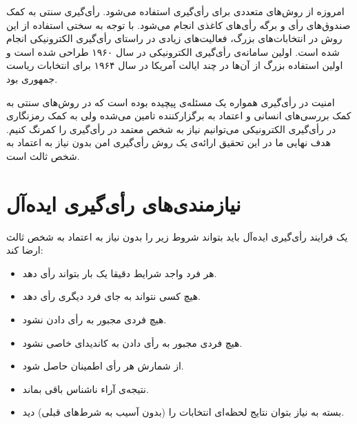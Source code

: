 \par
امروزه از روش‌های متعددی برای رأی‌گیری استفاده می‌شود. رأی‌گیری سنتی به کمک صندوق‌های رأی‌ و برگه‌ رأی‌های کاغذی انجام می‌شود. با توجه به سختی استفاده از این روش در انتخابات‌های بزرگ، فعالیت‌های زیادی در راستای رأی‌گیری الکترونیکی انجام شده است. اولین سامانه‌ی رأی‌گیری الکترونیکی در سال ۱۹۶۰ طراحی شده است و اولین استفاده‌ بزرگ از آن‌ها در چند ایالت آمریکا در سال ۱۹۶۴ برای انتخابات ریاست جمهوری بود. 

\par
امنیت در رأی‌گیری همواره یک مسئله‌ی پیچیده بوده است که در روش‌های سنتی به کمک بررسی‌های انسانی و اعتماد به برگزارکننده تامین می‌شده ولی به کمک رمزنگاری در رأی‌گیری الکترونیکی می‌توانیم نیاز به شخص معتمد در رأی‌گیری را کمرنگ کنیم. هدف نهایی ما در این تحقیق ارائه‌ی یک روش رأی‌گیری امن بدون نیاز به اعتماد به شخص ثالث است. 
\section{نیازمندی‌های رأی‌گیری ایده‌آل}

یک فرایند‌ رأی‌گیری ایده‌آل باید بتواند شروط زیر را بدون نیاز به اعتماد به شخص ثالث ارضا کند:
\begin{itemize}
	\item 
	هر فرد واجد شرایط دقیقا یک بار بتواند رأی دهد.
	\item 
	هیچ کسی نتواند به جای فرد دیگری رأی دهد.
	\item 
  	هیچ فردی مجبور به رأی دادن نشود.
  	\item 
  	هیچ فردی مجبور به رأی دادن به کاندیدای خاصی نشود.
  	\item 
  	از شمارش هر رأی اطمینان حاصل شود.
  	\item 
    نتیجه‌ی آراء ناشناس  باقی بماند. 
  	\item 
  	بسته به نیاز بتوان نتایج لحظه‌ای انتخابات را (بدون آسیب به شرط‌های قبلی) دید.
\end{itemize}

